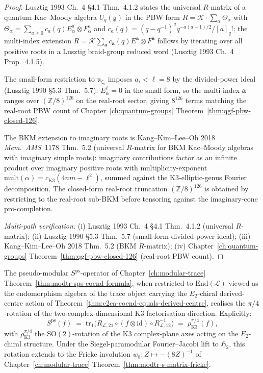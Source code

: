 \begin{proof}
Lusztig 1993 Ch.~4 \S4.1 Thm.~4.1.2 states the universal $R$-matrix of
a quantum Kac--Moody algebra $U_q(\mathfrak g)$ in the PBW form
$R = \mathcal K\cdot\sum_\alpha\Theta_\alpha$ with
$\Theta_\alpha = \sum_{a\ge 0}c_a(q)E_\alpha^a\otimes F_\alpha^a$ and
$c_a(q) = (q - q^{-1})^a q^{-a(a-1)/2}/[a]_q!$; the multi-index
extension $R = \mathcal K\sum_{\mathbf a}c_{\mathbf a}(q)E^{\mathbf a}
\otimes F^{\mathbf a}$ follows by iterating over all positive roots in
a Lusztig braid-group reduced word (Lusztig 1993 Ch.~4 Prop.~4.1.5).

The small-form restriction to $\mathfrak u_{\zeta_8}$ imposes
$a_i < \ell = 8$ by the divided-power ideal (Lusztig 1990 \S5.3
Thm.~5.7): $E_\alpha^\ell = 0$ in the small form, so the multi-index
$\mathbf a$ ranges over $(\mathbb Z/8)^{126}$ on the real-root sector,
giving $8^{126}$ terms matching the real-root PBW count of
Chapter~\ref{ch:quantum-groups}
Theorem~\ref{thm:qgf-pbw-closed-126}.

The BKM extension to imaginary roots is Kang--Kim--Lee--Oh 2018
\emph{Mem.\ AMS}~1178 Thm.~5.2 (universal $R$-matrix for BKM
Kac--Moody algebras with imaginary simple roots): imaginary
contributions factor as an infinite product over imaginary positive
roots with multiplicity-exponent $\mathrm{mult}(\alpha) =
c_{\mathrm{K3}}(4nm - \ell^2)$, summed against the K$3$-elliptic-genus
Fourier decomposition. The closed-form real-root truncation
$(\mathbb Z/8)^{126}$ is obtained by restricting to the
real-root sub-BKM before tensoring against the imaginary-cone
pro-completion.

\emph{Multi-path verification:}
(i) Lusztig 1993 Ch.~4 \S4.1 Thm.~4.1.2 (universal $R$-matrix);
(ii) Lusztig 1990 \S5.3 Thm.~5.7 (small-form divided-power ideal);
(iii) Kang--Kim--Lee--Oh 2018 Thm.~5.2 (BKM $R$-matrix);
(iv) Chapter~\ref{ch:quantum-groups}
 Theorem~\ref{thm:qgf-pbw-closed-126} (real-root PBW count).
\end{proof}

\begin{theorem}
\label{thm:e2ca-sps-from-braiding}
The pseudo-modular $S^{\mathrm{ps}}$-operator of
Chapter~\ref{ch:modular-trace}
Theorem~\ref{thm:modtr-sps-coend-formula}, when restricted to
$\mathrm{End}(\mathcal L)$ viewed as the endomorphism algebra of the
trace object carrying the $E_2$-chiral derived-centre action of
Theorem~\ref{thm:e2ca-coend-equals-derived-centre}, realises the
$\pi/4$-rotation of the two-complex-dimensional K3 factorisation
direction. Explicitly:
\[
 S^{\mathrm{ps}}(f)
 \;=\;
 \mathrm{tr}_1\bigl(R_{\mathcal L, 21}\circ (f\otimes\mathrm{id})
 \circ R_{\mathcal L, 12}^{-1}\bigr)
 \;=\;
 \rho_{\mathrm{K3}}^{\pi/4}(f),
\]
with $\rho_{\mathrm{K3}}^{\pi/4}$ the $\mathrm{SO}(2)$-rotation of the
K$3$ complex-plane axes acting on the $E_2$-chiral structure. Under
the Siegel-paramodular Fourier--Jacobi lift to $\mathfrak H_2$, this
rotation extends to the Fricke involution $w_8\colon Z\mapsto -(8Z)^{-1}$
of Chapter~\ref{ch:modular-trace}
Theorem~\ref{thm:modtr-s-matrix-fricke}.
\end{theorem}

